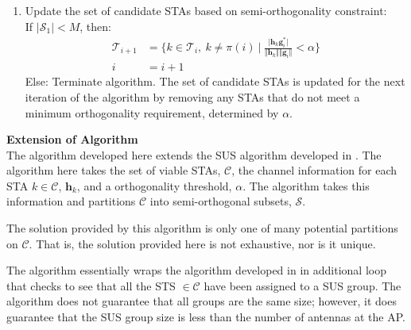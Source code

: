 \begin{enumerate}
    \item Update the set of candidate STAs based on semi-orthogonality constraint:\\
    If $\vert \mathcal{S}_1 \vert < M$, then:
    \begin{subequations}
        \begin{align}
            \mathcal{T}_{i+1} &= \bigg\lbrace k\in \mathcal{T}_i,\ k\neq \pi(i)\ \big \vert \ \frac{\vert \textbf{h}_k\textbf{g}_i^*\vert}{\Vert \textbf{h}_k \Vert \Vert \textbf{g}_i\Vert} < \alpha  \bigg\rbrace \\
            i &= i+1
        \end{align}
    \end{subequations}
    Else: Terminate algorithm.
    The set of candidate STAs is updated for the next iteration of the algorithm by  removing any STAs that do not meet a minimum orthogonality requirement, determined by $\alpha$.
\end{enumerate}


\textbf{Extension of Algorithm}\\
The algorithm developed here extends the SUS algorithm developed in \cite{1603708}. The algorithm here takes the set of viable STAs, $\mathcal{C}$, the channel information for each STA $k \in \mathcal{C}$, $\textbf{h}_k$, and a orthogonality threshold, $\alpha$. The algorithm takes this information and partitions $\mathcal{C}$ into semi-orthogonal subsets, $\mathscr{S}$.

The solution provided by this algorithm is only one of many potential partitions on $\mathcal{C}$. That is, the solution provided here is not exhaustive, nor is it unique.

The algorithm essentially wraps the algorithm developed in \cite{1603708} in additional loop that checks to see that all the STS $\in \mathcal{C}$ have been assigned to a SUS group. The algorithm does not guarantee that all groups are the same size; however, it does guarantee that the SUS group size is less than the number of antennas at the AP.

